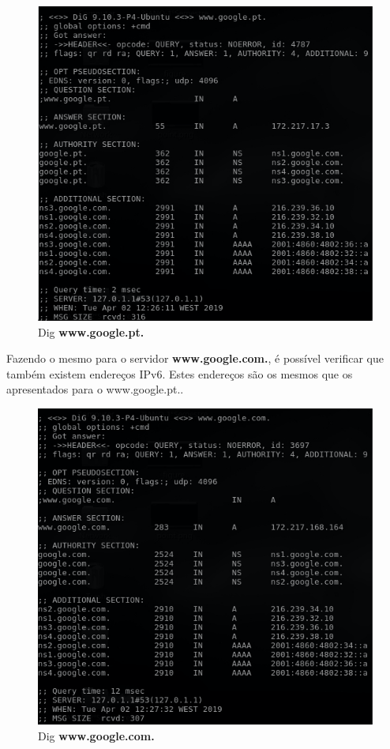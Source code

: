 \documentclass{llncs}
\begin{document}
\begin{figure}[H]
\begin{center}
\includegraphics[scale=0.5]{2_1.png}
\end{center}
\caption{\label{fig:1b1}Dig \textbf{www.google.pt.}}
\end{figure}


Fazendo o mesmo para o servidor \textbf{www.google.com.}, é possível verificar que também existem endereços IPv6. Estes endereços são os mesmos que os apresentados para o www.google.pt..

\begin{figure}[H]
\begin{center}
\includegraphics[scale=0.5]{2_2.png}
\end{center}
\caption{\label{fig:1b1}Dig \textbf{www.google.com.}}
\end{figure}
\end{document}
